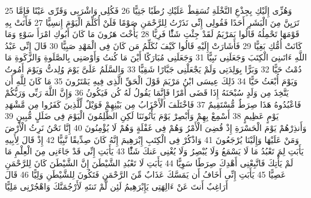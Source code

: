 \documentclass[20pt,a4paper]{article}
\begin{document}
{\tiny\colorbox{cl_aya}{25}} وَهُزِّى إِلَيْكِ بِجِذْعِ النَّخْلَةِ تُسَقِطْ عَلَيْكِ رُطَبًا جَنِيًّا
{\tiny\colorbox{cl_aya}{26}} فَكُلِى وَاشْرَبِى وَقَرِّى عَيْنًا فَإِمَّا تَرَيِنَّ مِنَ الْبَشَرِ أَحَدًا فَقُولِى إِنِّى نَذَرْتُ لِلرَّحْمَنِ صَوْمًا فَلَنْ أُكَلِّمَ الْيَوْمَ إِنسِيًّا
{\tiny\colorbox{cl_aya}{27}} فَأَتَتْ بِهِ قَوْمَهَا تَحْمِلُهُ قَالُوا يَمَرْيَمُ لَقَدْ جِئْتِ شَئًْا فَرِيًّا
{\tiny\colorbox{cl_aya}{28}} يَأُخْتَ هَرُونَ مَا كَانَ أَبُوكِ امْرَأَ سَوْءٍ وَمَا كَانَتْ أُمُّكِ بَغِيًّا
{\tiny\colorbox{cl_aya}{29}} فَأَشَارَتْ إِلَيْهِ قَالُوا كَيْفَ نُكَلِّمُ مَن كَانَ فِى الْمَهْدِ صَبِيًّا
{\tiny\colorbox{cl_aya}{30}} قَالَ إِنِّى عَبْدُ اللَّهِ ءَاتَىنِىَ الْكِتَبَ وَجَعَلَنِى نَبِيًّا
{\tiny\colorbox{cl_aya}{31}} وَجَعَلَنِى مُبَارَكًا أَيْنَ مَا كُنتُ وَأَوْصَنِى بِالصَّلَوةِ وَالزَّكَوةِ مَا دُمْتُ حَيًّا
{\tiny\colorbox{cl_aya}{32}} وَبَرًّا بِوَلِدَتِى وَلَمْ يَجْعَلْنِى جَبَّارًا شَقِيًّا
{\tiny\colorbox{cl_aya}{33}} وَالسَّلَمُ عَلَىَّ يَوْمَ وُلِدتُّ وَيَوْمَ أَمُوتُ وَيَوْمَ أُبْعَثُ حَيًّا
{\tiny\colorbox{cl_aya}{34}} ذَلِكَ عِيسَى ابْنُ مَرْيَمَ قَوْلَ الْحَقِّ الَّذِى فِيهِ يَمْتَرُونَ
{\tiny\colorbox{cl_aya}{35}} مَا كَانَ لِلَّهِ أَن يَتَّخِذَ مِن وَلَدٍ سُبْحَنَهُ إِذَا قَضَى أَمْرًا فَإِنَّمَا يَقُولُ لَهُ كُن فَيَكُونُ
{\tiny\colorbox{cl_aya}{36}} وَإِنَّ اللَّهَ رَبِّى وَرَبُّكُمْ فَاعْبُدُوهُ هَذَا صِرَطٌ مُّسْتَقِيمٌ
{\tiny\colorbox{cl_aya}{37}} فَاخْتَلَفَ الْأَحْزَابُ مِن بَيْنِهِمْ فَوَيْلٌ لِّلَّذِينَ كَفَرُوا مِن مَّشْهَدِ يَوْمٍ عَظِيمٍ
{\tiny\colorbox{cl_aya}{38}} أَسْمِعْ بِهِمْ وَأَبْصِرْ يَوْمَ يَأْتُونَنَا لَكِنِ الظَّلِمُونَ الْيَوْمَ فِى ضَلَلٍ مُّبِينٍ
{\tiny\colorbox{cl_aya}{39}} وَأَنذِرْهُمْ يَوْمَ الْحَسْرَةِ إِذْ قُضِىَ الْأَمْرُ وَهُمْ فِى غَفْلَةٍ وَهُمْ لَا يُؤْمِنُونَ
{\tiny\colorbox{cl_aya}{40}} إِنَّا نَحْنُ نَرِثُ الْأَرْضَ وَمَنْ عَلَيْهَا وَإِلَيْنَا يُرْجَعُونَ
{\tiny\colorbox{cl_aya}{41}} وَاذْكُرْ فِى الْكِتَبِ إِبْرَهِيمَ إِنَّهُ كَانَ صِدِّيقًا نَّبِيًّا
{\tiny\colorbox{cl_aya}{42}} إِذْ قَالَ لِأَبِيهِ يَأَبَتِ لِمَ تَعْبُدُ مَا لَا يَسْمَعُ وَلَا يُبْصِرُ وَلَا يُغْنِى عَنكَ شَئًْا
{\tiny\colorbox{cl_aya}{43}} يَأَبَتِ إِنِّى قَدْ جَاءَنِى مِنَ الْعِلْمِ مَا لَمْ يَأْتِكَ فَاتَّبِعْنِى أَهْدِكَ صِرَطًا سَوِيًّا
{\tiny\colorbox{cl_aya}{44}} يَأَبَتِ لَا تَعْبُدِ الشَّيْطَنَ إِنَّ الشَّيْطَنَ كَانَ لِلرَّحْمَنِ عَصِيًّا
{\tiny\colorbox{cl_aya}{45}} يَأَبَتِ إِنِّى أَخَافُ أَن يَمَسَّكَ عَذَابٌ مِّنَ الرَّحْمَنِ فَتَكُونَ لِلشَّيْطَنِ وَلِيًّا
{\tiny\colorbox{cl_aya}{46}} قَالَ أَرَاغِبٌ أَنتَ عَنْ ءَالِهَتِى يَإِبْرَهِيمُ لَئِن لَّمْ تَنتَهِ لَأَرْجُمَنَّكَ وَاهْجُرْنِى مَلِيًّا
\end{document}
